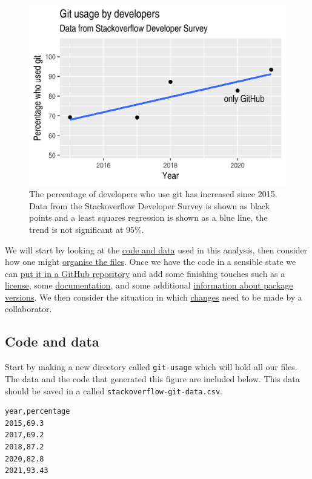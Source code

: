 \documentclass[11pt,onecolumn]{scrartcl}
\begin{document}
\begin{figure}[htbp]
\centering
\includegraphics[width=.9\linewidth]{./git-usage-1.png}
\caption{\label{fig:demo-result-1}The percentage of developers who use git has increased since 2015. Data from the Stackoverflow Developer Survey is shown as black points and a least squares regression is shown as a blue line, the trend is not significant at \(95\%\).}
\end{figure}

We will start by looking at the \hyperref[sec:org1512595]{code and data} used in this analysis, then
consider how one might \hyperref[sec:orgd51b455]{organise the files}. Once we have the code in a sensible
state we can \hyperref[sec:org6a50630]{put it in a GitHub repository} and add some finishing touches such
as a \hyperref[sec:org45b045c]{license}, some \hyperref[sec:org4c7e86a]{documentation}, and some additional \hyperref[sec:orgb36167d]{information about package
versions}. We then consider the situation in which \hyperref[sec:org3488b09]{changes} need to be made by a
collaborator.

\subsection{Code and data}
\label{sec:org1512595}

Start by making a new directory called \texttt{git-usage} which will hold all our
files. The data and the code that generated this figure are included below. This
data should be saved in a called \texttt{stackoverflow-git-data.csv}.

\begin{verbatim}
year,percentage
2015,69.3
2017,69.2
2018,87.2
2020,82.8
2021,93.43
\end{verbatim}
\end{document}
